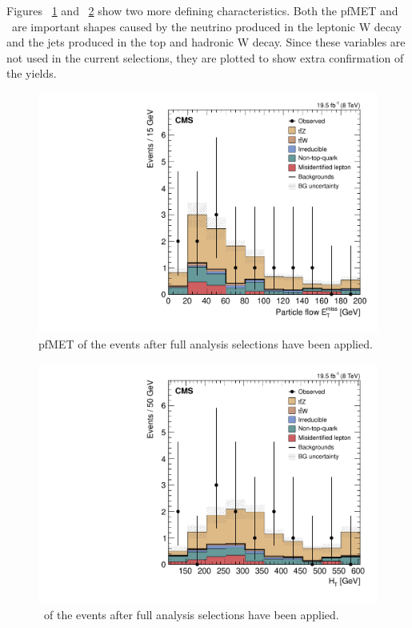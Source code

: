 Figures ~\ref{fig:hpfMET_3l2j2b} and ~\ref{fig:hHt_3l2j2b} show two more defining characteristics. Both the pfMET and \HT \ are important shapes caused by the neutrino produced in the leptonic W decay and the jets produced in the top and hadronic W decay. Since these variables are not used in the current selections, they are plotted to show extra confirmation of the yields.

\begin{figure}[h]
\begin{center}
\includegraphics[width=0.48\linewidth]{Figs/Plots_Final_Selections/hpfMET_3L2J2b.pdf}
\caption{\label{fig:hpfMET_3l2j2b}
pfMET of the events after full analysis selections have been applied.
}
\end{center}
\end{figure} 

\begin{figure}[h]
\begin{center}
\includegraphics[width=0.48\linewidth]{Figs/Plots_Final_Selections/hHt_3L2J2b.pdf}
\caption{\label{fig:hHt_3l2j2b}
\HT \ of the events after full analysis selections have been applied.
}
\end{center}
\end{figure} 















	
	
